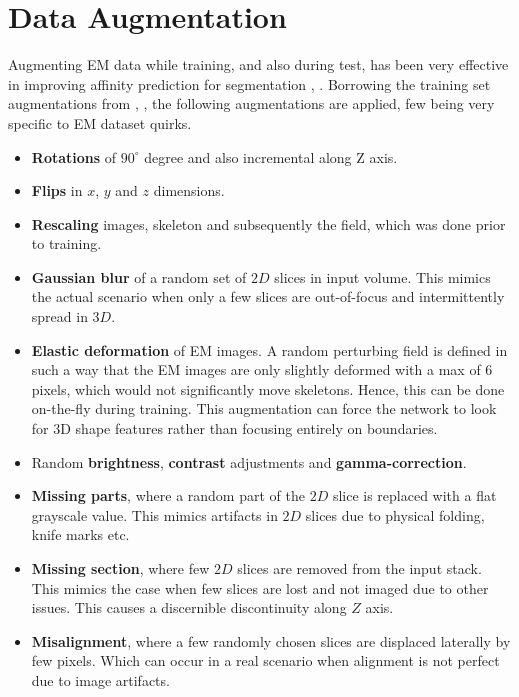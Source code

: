 \section{Data Augmentation}
Augmenting EM data while training, and also during test, has been very effective in improving affinity prediction for segmentation \cite{Zeng2017}, \cite{Kisuk2017}.
Borrowing the training set augmentations from \cite{Kisuk2017}, \cite{ELEKTRONN}, the following augmentations are applied, few being very specific to EM dataset quirks.
\begin{itemize}
	\item \textbf{Rotations} of $90^{\circ}$ degree and also incremental along Z axis.
	\item \textbf{Flips} in $x$, $y$ and $z$ dimensions.
	\item \textbf{Rescaling} images, skeleton and subsequently the field, which was done prior to training.
	\item \textbf{Gaussian blur} of a random set of $2D$ slices in input volume. This mimics the actual scenario when only a few slices are out-of-focus and intermittently spread in $3D$.
	\item \textbf{Elastic deformation} of EM images. A random perturbing field is defined in such a way that the EM images are only slightly deformed with a max of 6 pixels, which would not significantly move skeletons. Hence, this can be done on-the-fly during training. This augmentation can force the network to look for 3D shape features rather than focusing entirely on boundaries.
	\item Random \textbf{brightness}, \textbf{contrast} adjustments and \textbf{gamma-correction}.
	\item \textbf{Missing parts}, where a random part of the $2D$ slice is replaced with a flat grayscale value. This mimics artifacts in $2D$ slices due to physical folding, knife marks etc.
	\item \textbf{Missing section}, where few $2D$ slices are removed from the input stack. This mimics the case when few slices are lost and not imaged due to other issues. This causes a discernible discontinuity along $Z$ axis.
	\item \textbf{Misalignment}, where a few randomly chosen slices are displaced laterally by few pixels. Which can occur in a real scenario when alignment is not perfect due to image artifacts. 
\end{itemize}